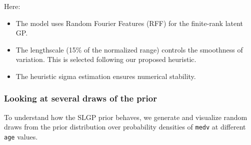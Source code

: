 \documentclass[
]{article}
\begin{document}
Here:

\begin{itemize}
\item
  The model uses Random Fourier Features (RFF) for the finite-rank latent GP.
\item
  The lengthscale (15\% of the normalized range) controls the smoothness of variation. This is selected following our proposed heuristic.
\item
  The heuristic sigma estimation ensures numerical stability.
\end{itemize}

\subsubsection{Looking at several draws of the prior}\label{looking-at-several-draws-of-the-prior}

To understand how the SLGP prior behaves, we generate and visualize random draws from the prior distribution over probability densities of \texttt{medv} at different \texttt{age} values.
\end{document}
